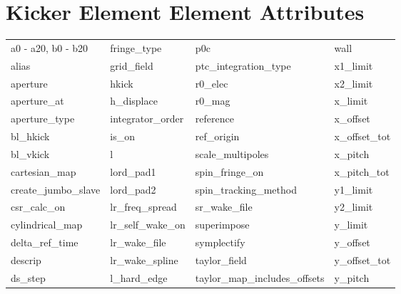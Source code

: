  \vfill
 
 \section{Kicker Element Element Attributes}
 \label{s:list.kicker}
 
 \begin{tabular}{llll} \toprule
a0 - a20, b0 - b20          & fringe_type                 & p0c                         & wall                        \\
alias                       & grid_field                  & ptc_integration_type        & x1_limit                    \\
aperture                    & hkick                       & r0_elec                     & x2_limit                    \\
aperture_at                 & h_displace                  & r0_mag                      & x_limit                     \\
aperture_type               & integrator_order            & reference                   & x_offset                    \\
bl_hkick                    & is_on                       & ref_origin                  & x_offset_tot                \\
bl_vkick                    & l                           & scale_multipoles            & x_pitch                     \\
cartesian_map               & lord_pad1                   & spin_fringe_on              & x_pitch_tot                 \\
create_jumbo_slave          & lord_pad2                   & spin_tracking_method        & y1_limit                    \\
csr_calc_on                 & lr_freq_spread              & sr_wake_file                & y2_limit                    \\
cylindrical_map             & lr_self_wake_on             & superimpose                 & y_limit                     \\
delta_ref_time              & lr_wake_file                & symplectify                 & y_offset                    \\
descrip                     & lr_wake_spline              & taylor_field                & y_offset_tot                \\
ds_step                     & l_hard_edge                 & taylor_map_includes_offsets & y_pitch                     \\

\end{tabular}
